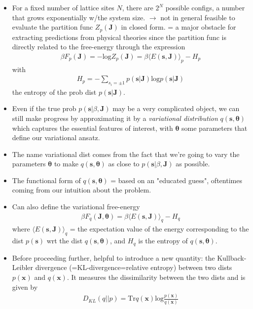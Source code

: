 \documentclass[norsk,a4paper,11pt]{article}
\begin{document}
\begin{itemize}
	\item For a fixed number of lattice sites $N$, there are $2^N$ possible configs, a number that grows exponentially w/the system size. $\rightarrow$ not in general feasible to evaluate the partition func $Z_p (\bm{J})$ in closed form. = a major obstacle for extracting predictions from physical theories since the partition func is directly related to the free-energy through the expression
	\begin{align}
		\beta F_p (\bm{J}) = -\text{log} Z_p (\bm{J}) = \beta \langle E(\bm{s}, \bm{J}) \rangle_p - H_p
	\end{align}
	with
	\begin{align}
		H_p = - \sum_{s_i = \pm 1} p(\bm{s}|\bm{J}) \text{log} p(\bm{s}|\bm{J})
	\end{align}
	the entropy of the prob dist $p(\bm{s}|\bm{J})$.
	\item Even if the true prob $p(\bm{s}|\beta, \bm{J})$ may be a very complicated object, we can still make progress by approximating it by a \textit{variational distribution} $q(\bm{s}, \bm{\theta})$ which captures the essential features of interest, with $\bm{\theta}$ some parameters that define our variational ansatz.
	\item The name variational dist comes from the fact that we're going to vary the parameters $\bm{\theta}$ to make $q(\bm{s}, \bm{\theta})$ as close to $p(\bm{s}|\beta, \bm{J})$ as possible.
	\item The functional form of $q(\bm{s}, \bm{\theta})$ = based on an "educated guess", oftentimes coming from our intuition about the problem.
	\item Can also define the variational free-energy
	\begin{align}
		\beta F_q (\bm{J}, \bm{\theta}) = \beta \langle E(\bm{s}, \bm{J}) \rangle_q - H_q
	\end{align}
	where $\langle E(\bm{s}, \bm{J}) \rangle_q$ = the expectation value of the energy corresponding to the dist $p(\bm{s})$ wrt the dist $q(\bm{s}, \bm{\theta})$, and $H_q$ is the entropy of $q(\bm{s}, \bm{\theta})$. 
	\item Before proceeding further, helpful to introduce a new quantity: the Kullback-Leibler divergence (=KL-divergence=relative entropy) between two dists $p(\bm{x})$ and $q(\bm{x})$. It measures the dissimilarity between the two dists and is given by 
	\begin{align}
		D_{KL}(q||p) = \text{Tr} q(\bm{x}) \text{log} \frac{p(\bm{x})}{q(\bm{x})}
	\end{align}

\end{itemize}
\end{document}
